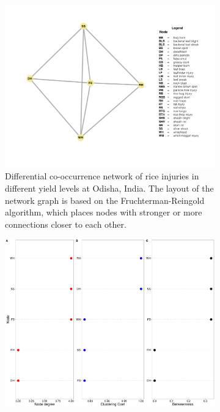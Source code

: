 \begin{figure}
    \centering
    \begin{subfigure}[b]{1\textwidth}
        \includegraphics[width = 1\textwidth]{figures/difyieldOD.pdf}
        \caption[Differential co-occurrence network of rice injuries in different yield levels at Odisha, India.]{Differential co-occurrence network of rice injuries in different yield levels at Odisha, India. The layout of the network graph is based on the Fruchterman-Reingold algorithm, which places nodes with stronger or more connections closer to each other.}
        \label{fig:difyieldnetwork_OD}
    \end{subfigure}
    \begin{subfigure}[b]{1\textwidth}
        \includegraphics[width = 1\textwidth]{figures/yield_dif_nodepropOdisha.pdf}

\end{subfigure}
\end{figure}

